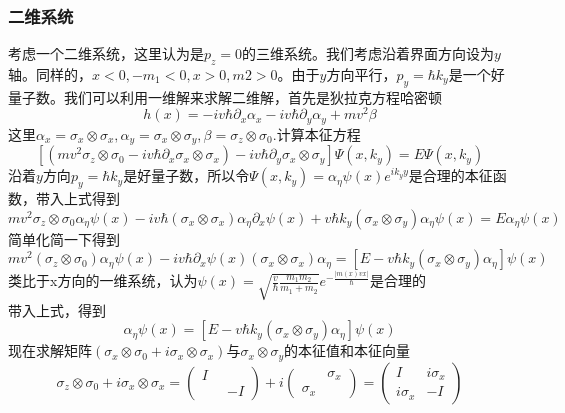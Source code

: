 \documentclass{article}
\numberwithin{equation}{subsection}
\begin{document}
\subsubsection{二维系统}
考虑一个二维系统，这里认为是$p_z=0$的三维系统。我们考虑沿着界面方向设为$y$轴。同样的，$x<0,-m_1<0,x>0,m2>0$。由于$y$方向平行，$p_y=\hbar k_y$是一个好量子数。我们可以利用一维解来求解二维解，首先是狄拉克方程哈密顿
\begin{equation}
    h(x)=-iv\hbar\partial_x\alpha_x-iv\hbar\partial_y\alpha_y+mv^2\beta
\end{equation}
这里$\alpha_x=\sigma_x\otimes\sigma_x,\alpha_y=\sigma_x\otimes\sigma_y,\beta=\sigma_z\otimes\sigma_0$.计算本征方程
\begin{equation}
    \left[(mv^2\sigma_z\otimes\sigma_0-iv\hbar\partial_x\sigma_x\otimes\sigma_x)-iv\hbar\partial_y\sigma_x\otimes\sigma_y\right]\Psi(x,k_y)=E\Psi(x,k_y)
\end{equation}
沿着$y$方向$p_y=\hbar k_y$是好量子数，所以令$\Psi(x,k_y)=\alpha_\eta\psi(x)e^{ik_yy}$是合理的本征函数，带入上式得到
\begin{equation}
    mv^2\sigma_z\otimes\sigma_0\alpha_\eta\psi(x)-iv\hbar(\sigma_x\otimes\sigma_x)\alpha_\eta\partial_x\psi(x)+v\hbar k_y(\sigma_x\otimes\sigma_y)\alpha_\eta\psi(x)=E\alpha_\eta\psi(x)
\end{equation}
简单化简一下得到
\begin{equation}
    mv^2(\sigma_z\otimes\sigma_0)\alpha_\eta\psi(x)-iv\hbar\partial_x\psi(x)(\sigma_x\otimes\sigma_x)\alpha_\eta=[E-v\hbar k_y(\sigma_x\otimes\sigma_y)\alpha_\eta]\psi(x)
\end{equation}
类比于x方向的一维系统，认为$\psi(x)=\sqrt{\frac{v}{\hbar}\frac{m_1m_2}{m_1+m_2}}e^{-\frac{|m(x)vx|}{\hbar}}$是合理的\\
带入上式，得到
\begin{equation}
    [mv^2(\sigma_x\otimes\sigma_0+i\sigma_x\otimes\sigma_x)]\alpha_\eta\psi(x)=[E-v\hbar k_y(\sigma_x\otimes\sigma_y)\alpha_\eta]\psi(x)
\end{equation}
现在求解矩阵$(\sigma_x\otimes\sigma_0+i\sigma_x\otimes\sigma_x)$与$\sigma_x\otimes\sigma_y$的本征值和本征向量
\begin{equation}
    \sigma_z\otimes\sigma_0+i\sigma_x\otimes\sigma_x=\begin{pmatrix}
        I&\quad\\\quad&-I
    \end{pmatrix}+i\begin{pmatrix}
        \quad&\sigma_x\\\sigma_x&\quad
    \end{pmatrix}=\begin{pmatrix}
        I&i\sigma_x\\i\sigma_x&-I
    \end{pmatrix}
\end{equation}
\end{document}
